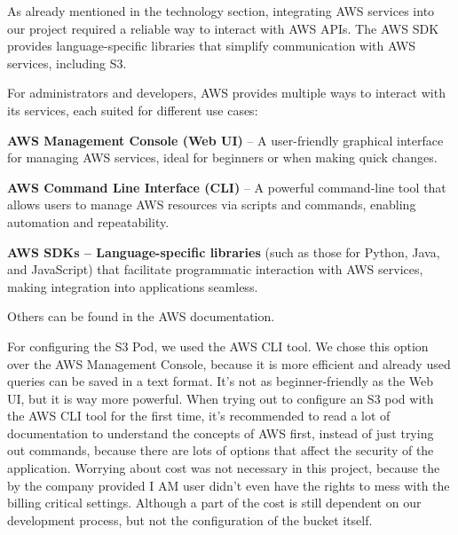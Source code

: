 As already mentioned in the technology section, integrating AWS services into our project required a reliable way to interact with AWS APIs. The AWS SDK provides language-specific libraries that simplify communication with AWS services, including S3.

For administrators and developers, AWS provides multiple ways to interact with its services, each suited for different use cases:
\begin{compactitem}
\item \textbf{AWS Management Console (Web UI)} – A user-friendly graphical interface for managing AWS services, ideal for beginners or when making quick changes.
\item \textbf{AWS Command Line Interface (CLI)} – A powerful command-line tool that allows users to manage AWS resources via scripts and commands, enabling automation and repeatability.
\item \textbf{AWS SDKs – Language-specific libraries} (such as those for Python, Java, and JavaScript) that facilitate programmatic interaction with AWS services, making integration into applications seamless.
\item Others can be found in the AWS documentation.
\end{compactitem}

For configuring the S3 Pod, we used the AWS CLI tool. We chose this option over the AWS Management Console, because it is more efficient and already used queries can be saved in a text format. It's not as beginner-friendly as the Web UI, but it is way more powerful. When trying out to configure an S3 pod with the AWS CLI tool for the first time, it's recommended to read a lot of documentation to understand the concepts of AWS first, instead of just trying out commands, because there are lots of options that affect the security of the application. Worrying about cost was not necessary in this project, because the by the company provided I AM user didn't even have the rights to mess with the billing critical settings. Although a part of the cost is still dependent on our development process, but not the configuration of the bucket itself. 

